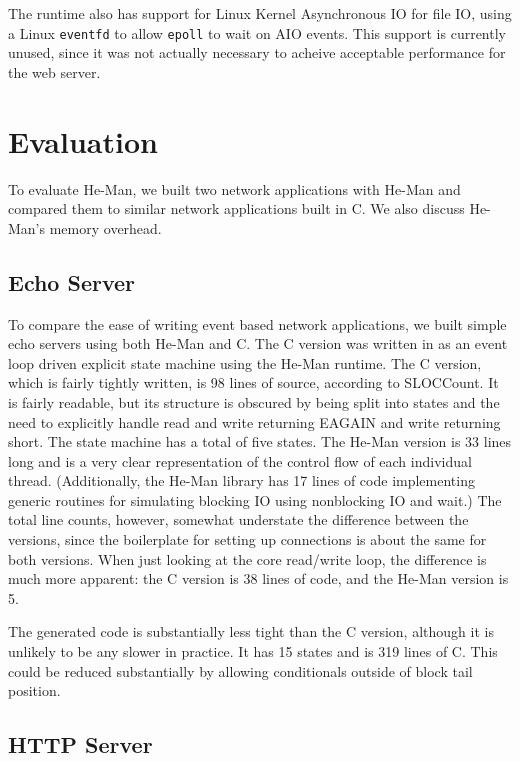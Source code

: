 \documentclass[preprint,11pt]{sigplanconf}
\renewcommand{\t}{\texttt}
\begin{document}
The runtime also has support for Linux Kernel Asynchronous IO for file
IO, using a Linux \t{eventfd} to allow \t{epoll} to wait on AIO
events. This support is currently unused, since it was not actually
necessary to acheive acceptable performance for the web server.

\section{Evaluation}\label{sec:evaluation}

To evaluate He-Man, we built two network applications with He-Man and
compared them to similar network applications built in C.
We also discuss He-Man's memory overhead.

\subsection{Echo Server}

To compare the ease of writing event based network applications, we
built simple echo servers using both He-Man and C. The C version was
written in as an event loop driven explicit state machine using the
He-Man runtime. The C version, which is fairly tightly written, is 98
lines of source, according to SLOCCount. It is fairly readable, but
its structure is obscured by being split into states and the need to
explicitly handle read and write returning EAGAIN and write returning
short. The state machine has a total of five states. The He-Man
version is 33 lines long and is a very clear representation of the
control flow of each individual thread. (Additionally, the He-Man
library has 17 lines of code implementing generic routines for
simulating blocking IO using nonblocking IO and wait.) The total line
counts, however, somewhat understate the difference between the
versions, since the boilerplate for setting up connections is about
the same for both versions. When just looking at the core read/write
loop, the difference is much more apparent: the C version is 38 lines
of code, and the He-Man version is 5.

The generated code is substantially less tight than the C version,
although it is unlikely to be any slower in practice. It has 15 states
and is 319 lines of C. This could be reduced substantially by allowing
conditionals outside of block tail position.

\subsection{HTTP Server}
\end{document}
